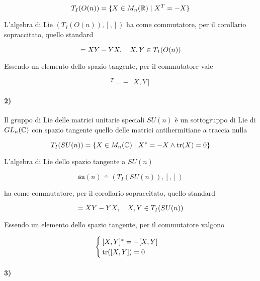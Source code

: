 \begin{equation}
	T_{I}(O(n)) = \{ X \in M_{n}(\mathbb{R}) \mid X^{T} = -X \}
\end{equation}

L'algebra di Lie $ (T_{I}(O(n)),[,]) $ ha come commutatore, per il corollario sopraccitato, quello standard

\begin{equation}
	[X,Y] = X Y - Y X \qcomma X,Y \in T_{I}(O(n))
\end{equation}

Essendo un elemento dello spazio tangente, per il commutatore vale

\begin{equation}
	[X,Y]^{T} = - [X,Y]
\end{equation}

\paragraph{2)}

Il gruppo di Lie delle matrici unitarie speciali $ SU(n) $ è un sottogruppo di Lie di $ GL_{n}(\mathbb{C}) $ con spazio tangente quello delle matrici antihermitiane a traccia nulla

\begin{equation}
	T_{I}(SU(n)) = \{ X \in M_{n}(\mathbb{C}) \mid X^{*} = -X \wedge \tr(X) = 0 \}
\end{equation}

L'algebra di Lie dello spazio tangente a $ SU(n) $

\begin{equation}
	\mathfrak{su}(n) \doteq (T_{I}(SU(n)),[,])
\end{equation}

ha come commutatore, per il corollario sopraccitato, quello standard

\begin{equation}
	[X,Y] = X Y - Y X \qcomma X,Y \in T_{I}(SU(n))
\end{equation}

Essendo un elemento dello spazio tangente, per il commutatore valgono

\begin{equation}
	\begin{cases}
		[X,Y]^{*} = - [X,Y]\\
		\tr([X,Y]) = 0
	\end{cases}
\end{equation}

\paragraph{3)}


